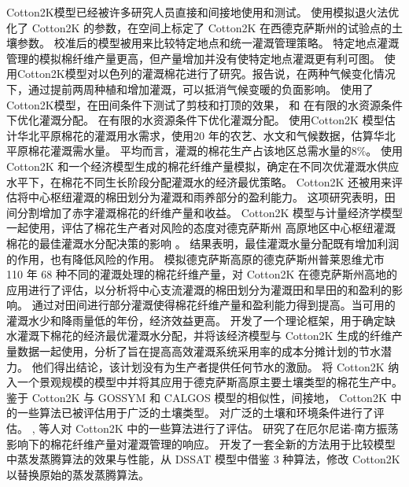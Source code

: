 Cotton2K模型已经被许多研究人员直接和间接地使用和测试。
 使用模拟退火法优化了 Cotton2K 的参数，在空间上标定了 Cotton2K 在西德克萨斯州的试验点的土壤参数。
校准后的模型被用来比较特定地点和统一灌溉管理策略。
特定地点灌溉管理的模拟棉纤维产量更高，但产量增加并没有使特定地点灌溉更有利可图。
 使用Cotton2K模型对以色列的灌溉棉花进行了研究。报告说，在两种气候变化情况下，通过提前两周种植和增加灌溉，可以抵消气候变暖的负面影响。
 使用了Cotton2K模型，在田间条件下测试了剪枝和打顶的效果，
 和  在有限的水资源条件下优化灌溉分配。
在有限的水资源条件下优化灌溉分配。
 使用Cotton2K 模型估计华北平原棉花的灌溉用水需求，使用20 年的农艺、水文和气候数据，估算华北平原棉花灌溉需水量。
平均而言，灌溉的棉花生产占该地区总需水量的8\%。
 使用 Cotton2K 和一个经济模型生成的棉花纤维产量模拟，确定在不同次优灌溉水供应水平下，在棉花不同生长阶段分配灌溉水的经济最优策略。
Cotton2K 还被用来评估将中心枢纽灌溉的棉田划分为灌溉和雨养部分的盈利能力\cite{nair2013}。
这项研究表明，田间分割增加了赤字灌溉棉花的纤维产量和收益。
Cotton2K 模型与计量经济学模型一起使用，评估了棉花生产者对风险的态度对德克萨斯州 高原地区中心枢纽灌溉棉花的最佳灌溉水分配决策的影响 \cite{nair2011}。
结果表明，最佳灌溉水量分配既有增加利润的作用，也有降低风险的作用。
 模拟德克萨斯高原的德克萨斯州普莱恩维尤市 110 年 68 种不同的灌溉处理的棉花纤维产量，对 Cotton2K 在德克萨斯州高地的应用进行了评估，以分析将中心支流灌溉的棉田划分为灌溉田和旱田的和盈利的影响。
通过对田间进行部分灌溉使得棉花纤维产量和盈利能力得到提高。当可用的灌溉水少和降雨量低的年份，经济效益更高。
 开发了一个理论框架，用于确定缺水灌溉下棉花的经济最优灌溉水分配，并将该经济模型与 Cotton2K 生成的纤维产量数据一起使用，分析了旨在提高高效灌溉系统采用率的成本分摊计划的节水潜力。
他们得出结论，该计划没有为生产者提供任何节水的激励。
 将 Cotton2K 纳入一个景观规模的模型中并将其应用于德克萨斯高原主要土壤类型的棉花生产中。
鉴于 Cotton2K 与 GOSSYM 和 CALGOS 模型的相似性，间接地， Cotton2K 中的一些算法已被评估用于广泛的土壤类型。
 对广泛的土壤和环境条件进行了评估。
,  等人对 Cotton2K 中的一些算法进行了评估。
 研究了在厄尔尼诺-南方振荡影响下的棉花纤维产量对灌溉管理的响应。
 开发了一套全新的方法用于比较模型中蒸发蒸腾算法的效果与性能，从 DSSAT 模型中借鉴 3 种算法，修改 Cotton2K 以替换原始的蒸发蒸腾算法。


